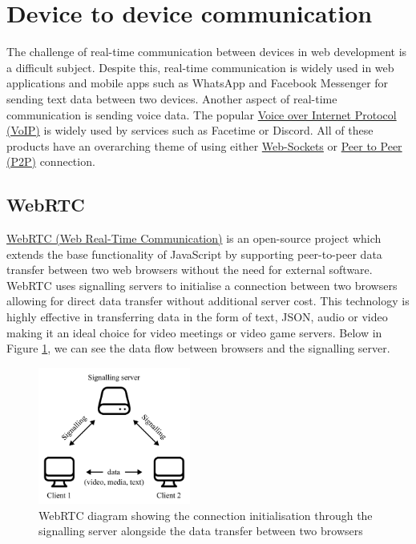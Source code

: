 \documentclass{l4proj}
\begin{document}
\section{Device to device communication}
The challenge of real-time communication between devices in web development is a difficult subject. Despite this, real-time communication is widely used in web applications and mobile apps such as WhatsApp and Facebook Messenger for sending text data between two devices. Another aspect of real-time communication is sending voice data. The popular \href{https://developer.mozilla.org/en-US/docs/Glossary/VoIP}{Voice over Internet Protocol (VoIP)} is widely used by services such as Facetime or Discord. All of these products have an overarching theme of using either \href{https://developer.mozilla.org/en-US/docs/Web/API/WebSocket}{Web-Sockets} or \href{https://developer.mozilla.org/en-US/docs/Glossary/P2P}{Peer to Peer (P2P)} connection.

\subsection{WebRTC}
\href{https://developer.mozilla.org/en-US/docs/Web/API/WebRTC_API}{WebRTC (Web Real-Time Communication)} \text is an open-source project which extends the base functionality of JavaScript by supporting peer-to-peer data transfer between two web browsers without the need for external software. WebRTC uses signalling servers to initialise a connection between two browsers allowing for direct data transfer without additional server cost. This technology is highly effective in transferring data in the form of text, JSON, audio or video making it an ideal choice for video meetings or video game servers. Below in Figure \ref{fig:webRTC}, we can see the data flow between browsers and the signalling server.

\begin{figure}[!ht]
    \centering
    \includegraphics[width=5cm]{dissertation/images/web-rtc-diagram.png}
    \caption{WebRTC diagram showing the connection initialisation through the signalling server alongside the data transfer between two browsers}
    \label{fig:webRTC}
\end{figure}
\end{document}
